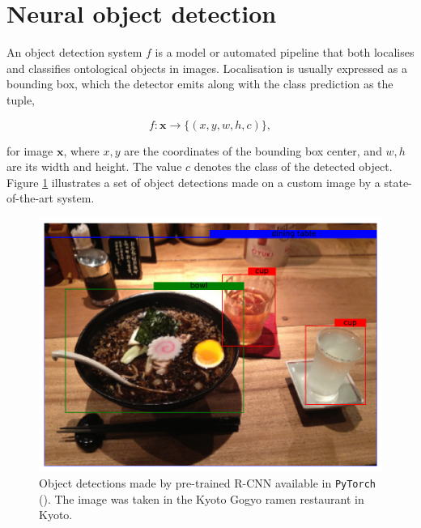 \section{Neural object detection}


An object detection system $f$ is a model or automated pipeline that both localises and classifies ontological objects in images. Localisation is usually expressed as a bounding box, which the detector emits along with the class prediction as the tuple,

\begin{equation}
f : \mathbf{x} \to \big\{(x, y, w, h, c)\big\},
\end{equation}

for image $\mathbf{x}$, where $x, y$ are the coordinates of the bounding box center, and $w, h$ are its width and height. The value $c$ denotes the class of the detected object. Figure \ref{fig:rcnn_ramen} illustrates a set of object detections made on a custom image by a state-of-the-art system.

\begin{figure}[h]
\centering
\includegraphics[width=\textwidth]{img/rcnn_ramen.pdf}
\caption{Object detections made by pre-trained R-CNN available in \texttt{PyTorch} (\cite{paszke2017automatic}). The image was taken in the Kyoto Gogyo ramen restaurant in Kyoto.}
\label{fig:rcnn_ramen}
\end{figure}

